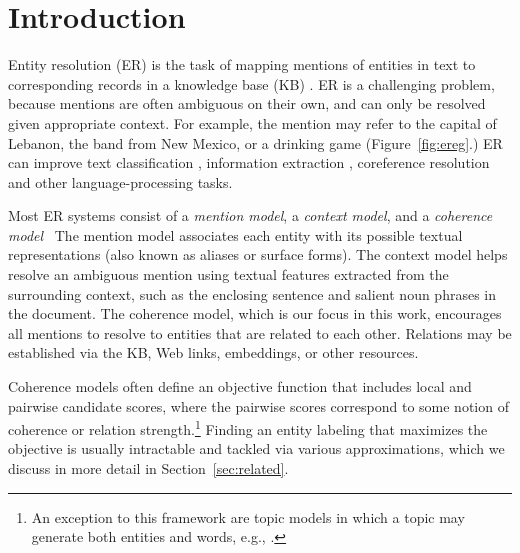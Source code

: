 \section{Introduction}
\label{sec:intro}

Entity resolution (ER) is the task of mapping mentions of entities in
text to corresponding records in a knowledge base (KB)
\cite{BunescuP06,Cucerzan07,KulkarniSRC09,Dredze2010,Hoffart2011,Hachey2013130}.
ER is a challenging problem, because mentions are often ambiguous on
their own, and can only be resolved given appropriate context.  For
example, the mention  may refer to the capital of
Lebanon, the band from New Mexico, or a drinking game
(Figure~\ref{fig:ereg}.)
ER can improve text classification \cite{Gabrilovich2007}, information
extraction \cite{Lin2012}, coreference resolution
\cite{finin2009Coreference,mayfield2009cross} and other
language-processing tasks.

Most ER systems consist of a \emph{mention model}, a \emph{context
  model}, and a \emph{coherence
  model}~\cite{Milne2008,Cucerzan07,Ratinov11,Hoffart2011,Hachey2013130}
The mention model associates each entity with its possible textual
representations (also known as aliases or surface forms).  The context
model helps resolve an ambiguous mention using textual features
extracted from the surrounding context, such as the enclosing sentence
and salient noun phrases in the document. The coherence model, which
is our focus in this work, encourages all mentions to resolve to
entities that are related to each other.  Relations may be established
via the KB, Web links, embeddings, or other resources.

Coherence models often define an objective function that includes
local and pairwise candidate scores, where the pairwise scores
correspond to some notion of coherence or relation
strength.\footnote{An exception to this framework are topic models in
  which a topic may generate both entities and words, e.g.,
  \cite{kataria2011,HanS12,houlsby2014scalable}.} Finding an entity
labeling that maximizes the objective is usually intractable and
tackled via various approximations, which we discuss in more detail in
Section~\ref{sec:related}. 

